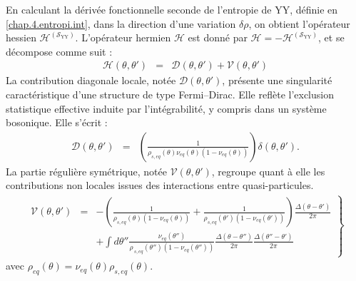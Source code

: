 En calculant la dérivée fonctionnelle seconde de l'entropie de \gls{YY}, définie en \eqref{chap.4.entropi.int}, dans la direction d'une variation $\delta \rho$, on obtient l'opérateur hessien $\mathcal{H}^{(\mathcal{S}_{\mathrm{YY}})}$.
L'opérateur hermien $\mathcal{H}$ est donné par $\mathcal{H} = -\mathcal{H}^{(\mathcal{S}_{\mathrm{YY}})}$, et se décompose comme suit :
\begin{eqnarray}
	\mathcal{H}(\theta, \theta') & = & \mathcal{D}(\theta, \theta') + \mathcal{V}(\theta, \theta')
	\label{chap:fluctu:eq:hessienne3}
\end{eqnarray}
La contribution diagonale locale, notée $\mathcal{D}(\theta, \theta')$, présente une singularité caractéristique d’une structure de type Fermi–Dirac. Elle reflète l’exclusion statistique effective induite par l’intégrabilité, y compris dans un système bosonique. Elle s’écrit :
\begin{eqnarray}\label{chap:fluctu:eq:irreg_0}
	\mathcal{D}(\theta, \theta') & = & \left ( \frac{1}{\rho_{\! s , eq}(\theta) \nu_{\! eq}(\theta) (1 - \nu_{\! eq}(\theta)) }\right )  \delta(\theta, \theta').
\end{eqnarray}
La partie régulière symétrique, notée $\mathcal{V}(\theta, \theta')$, regroupe quant à elle les contributions non locales issues des interactions entre quasi-particules.
\begin{eqnarray}
	\left . \begin{array}{rcl}\mathcal{V}(\theta, \theta')	 & = &  \displaystyle - \left ( \frac{1}{\rho_{\! s , eq}(\theta) (1 - \nu_{\! eq}(\theta) ) } + \frac{1}{\rho_{\! s, eq}(\theta')   (1 - \nu_{\! eq}(\theta')) }\right )\frac{\Delta(\theta - \theta')}{2\pi}\\
	&&  \displaystyle  + \int d \theta''  \frac{\nu_{\! eq}(\theta'')}{\rho_{\, s, eq}(\theta'')(1 - \nu_{\! eq}(\theta'')) } \frac{\Delta(\theta - \theta'' )}{2\pi} \frac{\Delta(\theta''  - \theta')}{2\pi}
	\end{array}\right \}
	\label{chap:fluctu:eq:reg}
\end{eqnarray}
avec $\rho_{\! eq}(\theta) = \nu_{\! eq}(\theta)\rho_{\! s, eq}(\theta)$.


